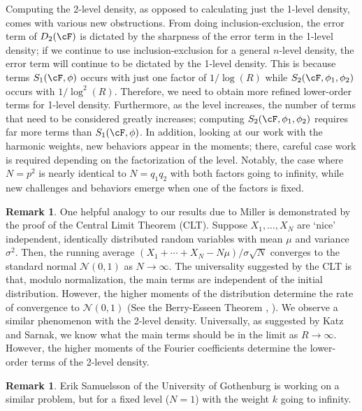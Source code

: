 \documentclass[11pt, reqno]{amsart}
\theoremstyle{definition}
\newtheorem{remark}[theorem]{Remark}
\theoremstyle{remark}
\numberwithin{equation}{section}
\begin{document}
Computing the 2-level density, as opposed to calculating just the 1-level density, comes with various new obstructions. From doing inclusion-exclusion, the error term of $D_2(\cF)$ is dictated by the sharpness of the error term in the 1-level density; if we continue to use inclusion-exclusion for a general $n$-level density, the error term will continue to be dictated by the 1-level density. This is because terms $S_1(\cF,\phi)$ occurs with just one factor of $1/\log(R)$ while $S_2(\cF,\phi_1,\phi_2)$ occurs with  $1/\log^2(R)$. Therefore, we need to obtain more refined lower-order terms for 1-level density. Furthermore, as the level increases, the number of terms that need to be considered greatly increases; computing $S_2(\cF,\phi_1,\phi_2)$ requires far more terms than $S_1(\cF,\phi)$. In addition, looking at our work with the harmonic weights, new behaviors appear in the moments; there, careful case work is required depending on the factorization of the level. Notably, the case where $N=p^2$ is nearly identical to $N=q_1q_2$ with both factors going to infinity, while new challenges and behaviors emerge when one of the factors is fixed. 

\begin{remark}
One helpful analogy to our results due to Miller \cite{Miller2009_LOTerms_1LevelDensity} is demonstrated by the proof of the Central Limit Theorem (CLT). Suppose
$X_1,\ldots, X_N$ are 
\lq nice' independent, identically distributed random variables with mean $\mu$ and variance
$\sigma^2$. Then, the running average $(X_1 + \cdots +X_N-N\mu)/\sigma \sqrt{N} $ converges to the standard normal  $\mathcal{N}(0,1)$ as $N\to \infty$.
The universality suggested by the CLT is that, modulo normalization, the main terms are independent of the initial distribution. 
However, the higher moments of the
distribution determine the rate of convergence to $\mathcal{N}(0,1)$ (See the Berry-Esseen Theorem \cite{Berry1941}, \cite{Esseen1942}). We observe a similar phenomenon with the 2-level density. Universally, as suggested by Katz and Sarnak, we know what the main terms should be in the limit as $R \to \infty$. However, the higher moments of the Fourier coefficients determine the lower-order terms of the 2-level density.
\end{remark}
\begin{remark}
     Erik Samuelsson \cite{SamuelssonPC} of the University of Gothenburg is working on a similar problem, but for a fixed level ($N = 1$) with the weight $k$ going to infinity.
\end{remark}
\end{document}
